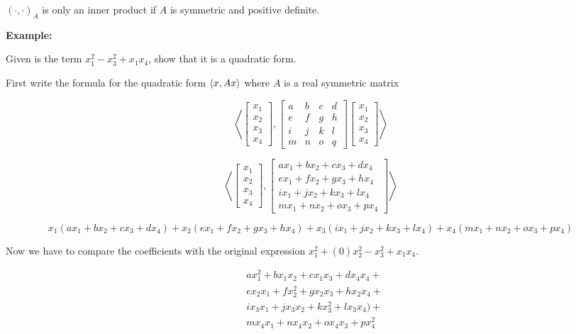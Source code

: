 \((\cdot , \cdot)_A\) is only an inner product if \(A\) is symmetric and positive definite.

\textbf{Example:}

Given is the term \(x_{1}^{2} - x_{3}^{2} + x_1 x_4\), show that it is a quadratic form.

First write the formula for the quadratic form \(\left\langle x, Ax\right\rangle\) where \(A\) is a real symmetric 
matrix

\[
    \left\langle 
    \begin{bmatrix}
        x_1 \\ x_2 \\ x_3 \\ x_4
    \end{bmatrix}
    ,
    \begin{bmatrix}
        a & b & c & d \\
        e & f & g & h \\
        i & j & k & l \\
        m & n & o & q  
    \end{bmatrix}
    \begin{bmatrix}
        x_1 \\ x_2 \\ x_3 \\ x_4
    \end{bmatrix}
    \right\rangle
\]

\[
    \left\langle 
    \begin{bmatrix}
        x_1 \\ x_2 \\ x_3 \\ x_4
    \end{bmatrix}
    ,
    \begin{bmatrix}
        ax_1  + bx_2 + cx_3 + dx_4\\ 
        ex_1  + fx_2 + gx_3 + hx_4\\ 
        ix_1  + jx_2 + kx_3 + lx_4\\ 
        mx_1  + nx_2 + ox_3 + px_4 
    \end{bmatrix}
    \right\rangle
\]

\[
    x_1(ax_1  + bx_2 + cx_3 + dx_4) + 
    x_2(ex_1  + fx_2 + gx_3 + hx_4) + 
    x_3(ix_1  + jx_2 + kx_3 + lx_4) +  
    x_4(mx_1  + nx_2 + ox_3 + px_4) 
\]

Now we have to compare the coefficients with the original expression 
\(x_{1}^{2} + (0)x_{2}^{2}  - x_{3}^{2} + x_1 x_4\).

\begin{align*}
    &ax_{1}^{2} + bx_1x_2 + cx_1x_3 + dx_4x_4 + \\ 
    &ex_2x_1  + fx_{2}^2 + gx_2x_3 + hx_2x_4 +  \\
    &ix_3x_1  + jx_3x_2 + kx_{3}^{2} + lx_3x_4) + \\
    &mx_4x_1  + nx_4x_2 + ox_4x_3 + px_{4}^{2}    
\end{align*}

